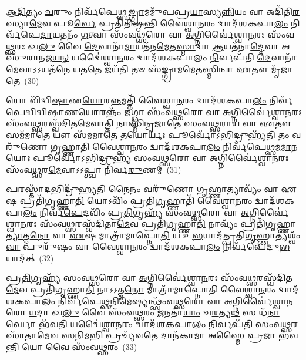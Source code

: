 \-\ul{𑌆}\-\-\ul{𑌦𑌿}\-𑌤𑍍𑌯𑌂 \ul{𑌚}\-𑌰𑍁𑌂 𑌨𑌿𑌰𑍍𑌵᳴𑌪𑍇𑌥𑍍𑌸\-\ul{𑌙𑍍𑌗𑍍𑌰𑌾}\-𑌮𑌮𑍁᳴𑌪𑌪𑍍𑌰\-\ul{𑌯𑌾}\-𑌸𑍍𑌯\-\ul{𑌨𑍍𑌨𑌿}\-𑌯𑌂 𑌵𑌾 𑌅𑌦𑌿᳴𑌤𑌿\-\ul{𑌰}\-𑌸𑍍𑌯𑌾\-\ul{𑌮𑍇}\-𑌵 𑌪𑍂\-\ul{𑌰𑍍𑌵𑍇} 𑌪𑍍𑌰𑌤𑌿᳴𑌤𑌿𑌷𑍍𑌠𑌨𑍍𑌤𑌿 𑌵𑍈𑌶𑍍𑌵𑌾\-\ul{𑌨}\-𑌰𑌂 𑌦𑍍𑌵𑌾𑌦᳴𑌶\-𑌕𑌪𑌾\-\ul{𑌲𑌂} 𑌨𑌿𑌰𑍍𑌵᳴𑌪𑍇\-\ul{𑌦𑌾}\-𑌯𑌤𑌨𑌂᳴ \ul{𑌗}\-𑌤𑍍𑌵𑌾 𑌸𑌂᳴𑌵\-\ul{𑌥𑍍𑌸}\-𑌰𑍋 𑌵𑌾 \ul{𑌅}\-𑌗𑍍𑌨𑌿𑌰𑍍𑌵𑍈॑𑌶𑍍𑌵𑌾\-\ul{𑌨}\-𑌰𑌃 𑌸𑌂᳴𑌵\-\ul{𑌥𑍍𑌸}\-𑌰𑌃 𑌖\-\ul{𑌲𑍁} 𑌵𑍈 \ul{𑌦𑍇}\-𑌵𑌾𑌨𑌾᳴\-\ul{𑌮𑌾}\-𑌯𑌤᳴𑌨\-\ul{𑌮𑍇}\-𑌤\-\ul{𑌸𑍍𑌮𑌾}\-𑌦𑍍𑌵𑌾 \ul{𑌆}\-𑌯𑌤᳴𑌨𑌾\-\ul{𑌦𑍍𑌦𑍇}\-𑌵𑌾 𑌅𑌸𑍁᳴𑌰𑌾𑌨𑌜\-\ul{𑌯}\-\-\ul{𑌨𑍍} 𑌯𑌦𑍍𑌵𑍈॑𑌶𑍍𑌵𑌾\-\ul{𑌨}\-𑌰𑌂 𑌦𑍍𑌵𑌾𑌦᳴𑌶\-𑌕𑌪𑌾𑌲𑌂 \ul{𑌨𑌿}\-𑌰𑍍𑌵𑌪᳴𑌤𑌿 \ul{𑌦𑍇}\-𑌵𑌾𑌨𑌾᳴\-\-\ul{𑌮𑍇}\-𑌵𑌾\-𑌽𑌽\-𑌯𑌤᳴𑌨𑍇 𑌯𑌤\-\ul{𑌤𑍇} 𑌜𑌯᳴\-\ul{𑌤𑌿} 𑌤𑍞 𑌸᳴\-\ul{𑌙𑍍𑌗𑍍𑌰𑌾}\-𑌮\-\ul{𑌮𑍇}\-𑌤\-\ul{𑌸𑍍𑌮𑌿}\-𑌨𑍍𑌵𑌾 \ul{𑌏}\-𑌤𑍗 𑌮𑍃᳴𑌜𑌾\-\ul{𑌤𑍇}\-~(30)

𑌯𑍋 𑌵𑌿᳴𑌦𑍍𑌵𑌿\-\ul{𑌷𑌾}\-𑌣\-\ul{𑌯𑍋}\-𑌰\-\ul{𑌨𑍍𑌨}\-𑌮𑌤𑍍𑌤𑌿᳴ 𑌵𑍈𑌶𑍍𑌵𑌾\-\ul{𑌨}\-𑌰𑌂 𑌦𑍍𑌵𑌾𑌦᳴𑌶\-𑌕𑌪𑌾\-\ul{𑌲𑌂} 𑌨𑌿𑌰𑍍𑌵᳴𑌪𑍇𑌦𑍍𑌵𑌿𑌦𑍍𑌵𑌿\-\ul{𑌷𑌾}\-𑌣\-\ul{𑌯𑍋}\-𑌰𑌨𑍍𑌨𑌂᳴ \ul{𑌜}\-𑌗𑍍𑌧𑍍𑌵𑌾 𑌸𑌂᳴𑌵\-\ul{𑌥𑍍𑌸}\-𑌰𑍋 𑌵𑌾 \ul{𑌅}\-𑌗𑍍𑌨𑌿𑌰𑍍𑌵𑍈॑𑌶𑍍𑌵𑌾\-\ul{𑌨}\-𑌰𑌃 𑌸𑌂᳴𑌵\-\ul{𑌥𑍍𑌸}\-𑌰𑌸𑍍𑌵᳴𑌦𑌿𑌤\-\ul{𑌮𑍇}\-𑌵𑌾\-\ul{𑌤𑍍𑌤𑌿} 𑌨𑌾𑌸𑍍𑌮𑌿᳴𑌨𑍍𑌮𑍃𑌜𑌾𑌤𑍇 𑌸𑌂𑌵\-\ul{𑌥𑍍𑌸}\-𑌰𑌾\-\ul{𑌯} 𑌵𑌾 \ul{𑌏}\-𑌤𑍗 𑌸𑌮᳴𑌮𑌾\-\ul{𑌤𑍇} 𑌯𑍗 𑌸᳴\-\ul{𑌮}\-𑌮𑌾\-\ul{𑌤𑍇} 𑌤\-\ul{𑌯𑍋}\-𑌰𑍍𑌯𑌃 𑌪𑍂𑌰𑍍𑌵𑍋᳴\-𑌽\-\ul{𑌭𑌿}\-𑌦𑍍𑌰𑍁𑌹𑍍𑌯᳴\-\ul{𑌤𑌿} 𑌤𑌂 𑌵𑌰𑍁᳴𑌣𑍋 𑌗𑍃𑌹𑍍𑌣𑌾𑌤𑌿 𑌵𑍈𑌶𑍍𑌵𑌾\-\ul{𑌨}\-𑌰𑌂 𑌦𑍍𑌵𑌾𑌦᳴𑌶\-𑌕𑌪𑌾\-\ul{𑌲𑌂} 𑌨𑌿𑌰𑍍𑌵᳴𑌪𑍇𑌥𑍍𑌸𑌮\-\ul{𑌮𑌾}\-𑌨\-\ul{𑌯𑍋𑌃} 𑌪𑍂𑌰𑍍𑌵𑍋᳴\-𑌽\-\ul{𑌭𑌿}\-𑌦𑍍𑌰𑍁𑌹𑍍𑌯᳴ 𑌸𑌂𑌵\-\ul{𑌥𑍍𑌸}\-𑌰𑍋 𑌵𑌾 \ul{𑌅}\-𑌗𑍍𑌨𑌿𑌰𑍍𑌵𑍈॑𑌶𑍍𑌵𑌾\-\ul{𑌨}\-𑌰𑌃 𑌸𑌂᳴𑌵\-\ul{𑌥𑍍𑌸}\-𑌰\-\ul{𑌮𑍇}\-𑌵𑌾𑌽𑌽𑌪𑍍𑌤𑍍𑌵𑌾 𑌨𑌿᳴𑌰𑍍𑌵\-\ul{𑌰𑍁}\-𑌣𑌮𑍍~(31)

\-\ul{𑌪}\-𑌰𑌸𑍍𑌤𑌾᳴\-\ul{𑌦}\-𑌭𑌿𑌦𑍍𑌰𑍁᳴𑌹𑍍𑌯\-\ul{𑌤𑌿} 𑌨𑍈\-\ul{𑌨𑌂} 𑌵𑌰𑍁᳴𑌣𑍋 𑌗𑍃𑌹𑍍𑌣𑌾\-\ul{𑌤𑍍𑌯𑌾}\-𑌵𑍍𑌯𑌂᳴ 𑌵𑌾 \ul{𑌏}\-𑌷 𑌪𑍍𑌰𑌤𑌿᳴𑌗𑍃𑌹𑍍𑌣𑌾\-\ul{𑌤𑌿} 𑌯𑍋\-𑌽𑌵𑌿𑌂᳴ 𑌪𑍍𑌰𑌤𑌿\-\ul{𑌗𑍃}\-𑌹𑍍𑌣𑌾𑌤𑌿᳴ 𑌵𑍈𑌶𑍍𑌵𑌾\-\ul{𑌨}\-𑌰𑌂 𑌦𑍍𑌵𑌾𑌦᳴𑌶\-𑌕𑌪𑌾\-\ul{𑌲𑌂} 𑌨𑌿𑌰𑍍𑌵᳴\-\ul{𑌪𑍇}\-𑌦𑌵𑌿𑌂᳴ 𑌪𑍍𑌰\-\ul{𑌤𑌿}\-𑌗𑍃𑌹𑍍𑌯᳴ 𑌸𑌂𑌵\-\ul{𑌥𑍍𑌸}\-𑌰𑍋 𑌵𑌾 \ul{𑌅}\-𑌗𑍍𑌨𑌿𑌰𑍍𑌵𑍈॑𑌶𑍍𑌵𑌾\-\ul{𑌨}\-𑌰𑌃 𑌸𑌂᳴𑌵\-\ul{𑌥𑍍𑌸}\-𑌰𑌸𑍍𑌵᳴𑌦𑌿𑌤𑌾\-\ul{𑌮𑍇}\-𑌵 𑌪𑍍𑌰𑌤𑌿᳴𑌗𑍃𑌹𑍍𑌣𑌾\-\ul{𑌤𑌿} 𑌨𑌾𑌵𑍍𑌯𑌂᳴ 𑌪𑍍𑌰𑌤𑌿᳴\-𑌗𑍃𑌹𑍍𑌣𑌾\-\ul{𑌤𑍍𑌯𑌾}\-𑌤𑍍𑌮\-\ul{𑌨𑍋} 𑌵𑌾 \ul{𑌏}\-𑌷 𑌮𑌾𑌤𑍍𑌰𑌾᳴𑌮𑌾𑌪𑍍𑌨𑍋\-\ul{𑌤𑌿} 𑌯 𑌉᳴\-\ul{𑌭}\-𑌯𑌾𑌦᳴𑌤𑍍𑌪𑍍𑌰𑌤𑌿\-\ul{𑌗𑍃}\-𑌹𑍍𑌣𑌾𑌤𑍍𑌯𑌶𑍍𑌵𑌂᳴ \ul{𑌵𑌾} 𑌪𑍁𑌰𑍁᳴𑌷𑌂 𑌵𑌾 𑌵𑍈𑌶𑍍𑌵𑌾\-\ul{𑌨}\-𑌰𑌂 𑌦𑍍𑌵𑌾𑌦᳴𑌶\-𑌕𑌪𑌾\-\ul{𑌲𑌂} 𑌨𑌿𑌰𑍍𑌵᳴𑌪𑍇𑌦𑍁\-\ul{𑌭}\-𑌯𑌾𑌦᳴𑌤𑍍~(32)

𑌪𑍍𑌰\-\ul{𑌤𑌿}\-𑌗𑍃𑌹𑍍𑌯᳴ 𑌸𑌂𑌵\-\ul{𑌥𑍍𑌸}\-𑌰𑍋 𑌵𑌾 \ul{𑌅}\-𑌗𑍍𑌨𑌿𑌰𑍍𑌵𑍈॑𑌶𑍍𑌵𑌾\-\ul{𑌨}\-𑌰𑌃 𑌸𑌂᳴𑌵\-\ul{𑌥𑍍𑌸}\-𑌰𑌸𑍍𑌵᳴𑌦𑌿𑌤\-\ul{𑌮𑍇}\-𑌵 𑌪𑍍𑌰𑌤𑌿᳴𑌗𑍃𑌹𑍍𑌣𑌾\-\ul{𑌤𑌿} 𑌨𑌾𑌽𑌽𑌤𑍍𑌮\-\ul{𑌨𑍋} 𑌮𑌾𑌤𑍍𑌰𑌾᳴𑌮𑌾𑌪𑍍𑌨𑍋𑌤𑌿 𑌵𑍈𑌶𑍍𑌵𑌾\-\ul{𑌨}\-𑌰𑌂 𑌦𑍍𑌵𑌾𑌦᳴𑌶\-𑌕𑌪𑌾\-\ul{𑌲𑌂} 𑌨𑌿𑌰𑍍𑌵᳴𑌪𑍇\-\ul{𑌥𑍍𑌸}\-𑌨𑌿\-\ul{𑌮𑍇}\-𑌷𑍍𑌯𑌨𑍍𑌥𑍍𑌸𑌂᳴𑌵\-\ul{𑌥𑍍𑌸}\-𑌰𑍋 𑌵𑌾 \ul{𑌅}\-𑌗𑍍𑌨𑌿𑌰𑍍𑌵𑍈॑𑌶𑍍𑌵𑌾\-\ul{𑌨}\-𑌰𑍋 \ul{𑌯}\-𑌦𑌾 𑌖\-\ul{𑌲𑍁} 𑌵𑍈 𑌸𑌂᳴𑌵\-\ul{𑌥𑍍𑌸}\-𑌰𑌂 \ul{𑌜}\-𑌨𑌤𑌾᳴\-\ul{𑌯𑌾𑌂} 𑌚\-\ul{𑌰}\-𑌤𑍍𑌯\-\ul{𑌥} 𑌸 𑌧᳴\-\ul{𑌨𑌾}\-𑌰𑍍𑌘𑍋 𑌭᳴𑌵\-\ul{𑌤𑌿} 𑌯𑌦𑍍𑌵𑍈॑𑌶𑍍𑌵𑌾\-\ul{𑌨}\-𑌰𑌂 𑌦𑍍𑌵𑌾𑌦᳴𑌶\-𑌕𑌪𑌾𑌲𑌂 \ul{𑌨𑌿}\-𑌰𑍍𑌵𑌪᳴𑌤𑌿 𑌸𑌂𑌵\-\ul{𑌥𑍍𑌸}\-𑌰𑌸𑌾᳴𑌤𑌾\-\ul{𑌮𑍇}\-𑌵 \ul{𑌸}\-𑌨𑌿\-\ul{𑌮}\-𑌭𑌿 𑌪𑍍𑌰𑌚𑍍𑌯᳴𑌵\-\ul{𑌤𑍇} 𑌦𑌾𑌨᳴𑌕𑌾𑌮𑌾 𑌅𑌸𑍍𑌮𑍈 \ul{𑌪𑍍𑌰}\-𑌜𑌾 𑌭᳴𑌵\-\ul{𑌨𑍍𑌤𑌿} 𑌯𑍋 𑌵𑍈 𑌸𑌂᳴𑌵\-\ul{𑌥𑍍𑌸}\-𑌰𑌂~(33)

